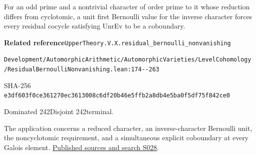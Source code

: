 
\begin{formalstatement}[D108]\label{decomp:D108}
For an odd prime and a nontrivial character of order prime to it whose reduction differs from cyclotomic, a unit first Bernoulli value for the inverse character forces every residual cocycle satisfying UnrEv to be a coboundary.
\end{formalstatement}
{\small\raggedright\noindent\textsf{\bfseries Related reference}\quad \nolinkurl{UpperTheory.V.X.residual_bernoulli_nonvanishing}\par\noindent \nolinkurl{Development/AutomorphicArithmetic/AutomorphicVarieties/LevelCohomology/ResidualBernoulliNonvanishing.lean:174--263}\par\noindent SHA-256 \nolinkurl{e3df603f0ce361270ec3613008c6df20b46e5ffb2a8db4e5ba0f5df75f842ce0}\par\noindent Dominated 242\quad Disjoint 242\quad terminal.\par}
The application concerns a reduced character, an inverse-character Bernoulli unit, the noncyclotomic requirement, and a simultaneous explicit coboundary at every Galois element.
\hyperref[lit:S028]{Published sources and search S028}.
